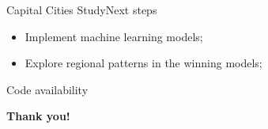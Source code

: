 \documentclass[xcolor=dvipsnames,t,aspectratio=169]{beamer} %
\begin{document}
\begin{frame}[c]{Capital Cities Study}{Next steps}

    \begin{itemize}
        \item Implement machine learning models;
        \item Explore regional patterns in the winning models;
    \end{itemize}

\end{frame}


\nocite{*}
\begin{frame}[c]{Code availability}

    \printbibliography
    
\end{frame}

\begin{frame}[c]
  \centering
  \Huge \textbf{Thank you!}
\end{frame}
\end{document}
